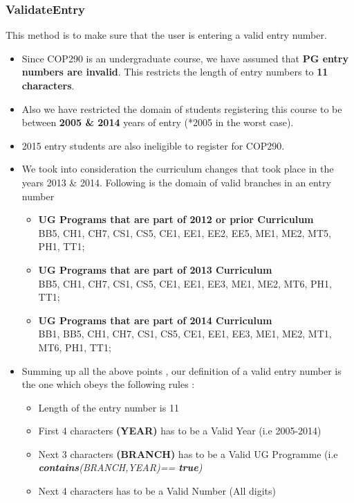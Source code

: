 \documentclass[12pt]{article}
\begin{document}
\subsubsection{ValidateEntry}  This method is to make sure that the user is entering a valid entry number.
\begin{itemize}
\item Since COP290 is an undergraduate course, we have assumed that \textbf{PG entry numbers are invalid}. This restricts the length of entry numbers to \textbf{11 characters}.
\item Also we have restricted the domain of students registering this course to be between \textbf{2005 \& 2014} years of entry (*2005 in the worst case).
\item 2015 entry students are also ineligible to register for COP290.
\item We took into consideration the curriculum changes that took place in the years 2013 \& 2014. Following is the domain of valid branches in an entry number
\begin{itemize}
\item \textbf{UG Programs that are part of 2012 or prior Curriculum}\\
BB5, CH1, CH7, CS1, CS5, CE1, EE1, EE2, EE5, ME1, ME2, MT5, PH1, TT1;
\item \textbf{UG Programs that are part of 2013 Curriculum}\\
BB5, CH1, CH7, CS1, CS5, CE1, EE1, EE3, ME1, ME2, MT6, PH1, TT1;
\item \textbf{UG Programs that are part of 2014 Curriculum}\\
BB1, BB5, CH1, CH7, CS1, CS5, CE1, EE1, EE3, ME1, ME2, MT1, MT6, PH1, TT1;
\end{itemize}

\item Summing up all the above points , our definition of a valid entry number is the one which obeys the following rules : 
\begin{itemize}
\item Length of the entry number is 11
\item First 4 characters \textbf{(YEAR)} has to be a Valid Year (i.e 2005-2014)
\item Next 3 characters \textbf{(BRANCH)} has to be a Valid UG Programme (i.e  \em{\textbf{contains}(BRANCH,YEAR)== \textbf{true}})
\item Next 4 characters has to be a Valid Number (All digits)
\end{itemize}
\end{itemize}
\end{document}
